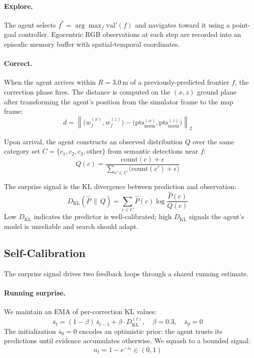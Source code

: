 \documentclass[10pt,twocolumn,letterpaper]{article}
\begin{document}
\paragraph{Explore.} The agent selects $f^* = \arg\max_f \mathrm{val}'(f)$ and navigates toward it using a point-goal controller. Egocentric RGB observations at each step are recorded into an episodic memory buffer with spatial-temporal coordinates.

\paragraph{Correct.} When the agent arrives within $R = 3.0$\,m of a previously-predicted frontier $f$, the correction phase fires. The distance is computed on the $(x,z)$ ground plane after transforming the agent's position from the simulator frame to the map frame:
\begin{equation}
    d = \left\lVert \big(w_f^{(x)}, w_f^{(z)}\big) - \big(\mathrm{pts}_{\text{norm}}^{(x)}, \mathrm{pts}_{\text{norm}}^{(z)}\big) \right\rVert_2
    \label{eq:arrival}
\end{equation}

Upon arrival, the agent constructs an observed distribution $Q$ over the same category set $C = \{c_1, c_2, c_3, \text{other}\}$ from semantic detections near $f$:
\begin{equation}
    Q(c) = \frac{\mathrm{count}(c) + \epsilon}{\sum_{c' \in C} \big(\mathrm{count}(c') + \epsilon\big)}
    \label{eq:observed}
\end{equation}

The surprise signal is the KL divergence between prediction and observation:
\begin{equation}
    D_{\mathrm{KL}}(\hat{P} \,\|\, Q) = \sum_{c \in C} \hat{P}(c) \log \frac{\hat{P}(c)}{Q(c)}
    \label{eq:kl}
\end{equation}
Low $D_{\mathrm{KL}}$ indicates the predictor is well-calibrated; high $D_{\mathrm{KL}}$ signals the agent's model is unreliable and search should adapt.

\subsection{Self-Calibration}
\label{sec:calibration}

The surprise signal drives two feedback loops through a shared running estimate.

\paragraph{Running surprise.} We maintain an EMA of per-correction KL values:
\begin{equation}
    \bar{s}_t = (1 - \beta)\,\bar{s}_{t-1} + \beta \cdot D_{\mathrm{KL}}^{(t)}, \quad \beta = 0.3, \quad \bar{s}_0 = 0
    \label{eq:ema}
\end{equation}
The initialization $\bar{s}_0 = 0$ encodes an optimistic prior: the agent trusts its predictions until evidence accumulates otherwise. We squash to a bounded signal:
\begin{equation}
    n_t = 1 - e^{-\bar{s}_t} \in (0, 1)
    \label{eq:squash}
\end{equation}
\end{document}

